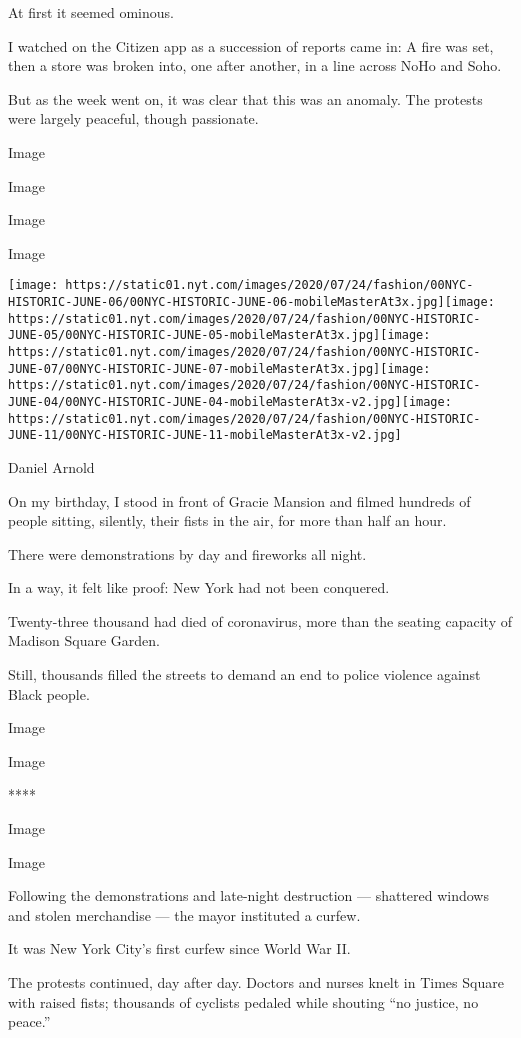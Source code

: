 At first it seemed ominous.

I watched on the Citizen app as a succession of reports came in: A fire
was set, then a store was broken into, one after another, in a line
across NoHo and Soho.

But as the week went on, it was clear that this was an anomaly. The
protests were largely peaceful, though passionate.

Image

Image

Image

Image

\texttt{[image: https://static01.nyt.com/images/2020/07/24/fashion/00NYC-HISTORIC-JUNE-06/00NYC-HISTORIC-JUNE-06-mobileMasterAt3x.jpg]}\texttt{[image: https://static01.nyt.com/images/2020/07/24/fashion/00NYC-HISTORIC-JUNE-05/00NYC-HISTORIC-JUNE-05-mobileMasterAt3x.jpg]}\texttt{[image: https://static01.nyt.com/images/2020/07/24/fashion/00NYC-HISTORIC-JUNE-07/00NYC-HISTORIC-JUNE-07-mobileMasterAt3x.jpg]}\texttt{[image: https://static01.nyt.com/images/2020/07/24/fashion/00NYC-HISTORIC-JUNE-04/00NYC-HISTORIC-JUNE-04-mobileMasterAt3x-v2.jpg]}\texttt{[image: https://static01.nyt.com/images/2020/07/24/fashion/00NYC-HISTORIC-JUNE-11/00NYC-HISTORIC-JUNE-11-mobileMasterAt3x-v2.jpg]}

Daniel Arnold

On my birthday, I stood in front of Gracie Mansion and filmed hundreds
of people sitting, silently, their fists in the air, for more than half
an hour.

There were demonstrations by day and fireworks all night.

In a way, it felt like proof: New York had not been conquered.

Twenty-three thousand had died of coronavirus, more than the seating
capacity of Madison Square Garden.

Still, thousands filled the streets to demand an end to police violence
against Black people.

Image

Image

****

Image

Image

Following the demonstrations and late-night destruction --- shattered
windows and stolen merchandise --- the mayor instituted a curfew.

It was New York City's first curfew since World War II.

The protests continued, day after day. Doctors and nurses knelt in Times
Square with raised fists; thousands of cyclists pedaled while shouting
``no justice, no peace.''

